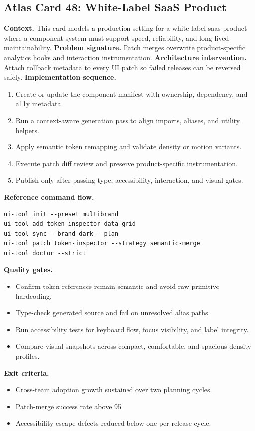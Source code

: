 \subsection*{Atlas Card 48: White-Label SaaS Product}
\textbf{Context.} This card models a production setting for a white-label saas product where a component system must support speed, reliability, and long-lived maintainability.
\textbf{Problem signature.} Patch merges overwrite product-specific analytics hooks and interaction instrumentation.
\textbf{Architecture intervention.} Attach rollback metadata to every UI patch so failed releases can be reversed safely.
\textbf{Implementation sequence.}
\begin{enumerate}[leftmargin=*, itemsep=0.28em]
  \item Create or update the component manifest with ownership, dependency, and a11y metadata.
  \item Run a context-aware generation pass to align imports, aliases, and utility helpers.
  \item Apply semantic token remapping and validate density or motion variants.
  \item Execute patch diff review and preserve product-specific instrumentation.
  \item Publish only after passing type, accessibility, interaction, and visual gates.
\end{enumerate}
\textbf{Reference command flow.}
\begin{verbatim}
ui-tool init --preset multibrand
ui-tool add token-inspector data-grid
ui-tool sync --brand dark --plan
ui-tool patch token-inspector --strategy semantic-merge
ui-tool doctor --strict
\end{verbatim}
\textbf{Quality gates.}
\begin{itemize}[leftmargin=*, itemsep=0.24em]
  \item Confirm token references remain semantic and avoid raw primitive hardcoding.
  \item Type-check generated source and fail on unresolved alias paths.
  \item Run accessibility tests for keyboard flow, focus visibility, and label integrity.
  \item Compare visual snapshots across compact, comfortable, and spacious density profiles.
\end{itemize}
\textbf{Exit criteria.}
\begin{itemize}[leftmargin=*, itemsep=0.24em]
  \item Cross-team adoption growth sustained over two planning cycles.
  \item Patch-merge success rate above 95%
  \item Accessibility escape defects reduced below one per release cycle.
\end{itemize}
\clearpage
